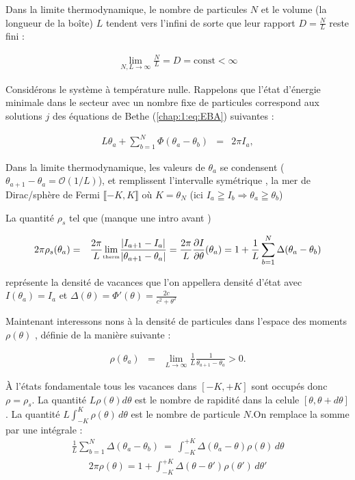 Dans la limite thermodynamique, le nombre de particules \( N \) et le volume 
(la longueur de la boîte) \( L \) tendent vers l'infini de sorte que leur rapport 
\( D = \frac{N}{L} \) reste fini :

\begin{eqnarray*}
	\lim_{N, L \to \infty} \frac{N}{L} = D = \mbox{const} < \infty	
\end{eqnarray*}

Considérons le système à température nulle. Rappelons que l'état 
d'énergie minimale dans le secteur avec un nombre fixe de particules 
correspond aux solutions \( j \) des équations de Bethe (\eqref{chap:1:eq:EBA}) suivantes :

\begin{eqnarray*}
	L \theta_a + \sum_{b = 1}^N \Phi ( \theta_a - \theta_b ) & = & 2\pi I_a ,	
\end{eqnarray*}

Dans la limite thermodynamique, les valeurs de \( \theta_a \) se condensent (\(\theta_{a+1} - \theta_a = \mathcal{O}(1/L)\)), et remplissent l'intervalle symétrique , la mer de Dirac/sphère de Fermi  \(\llbracket-K, K\rrbracket\) où $K = \theta_N$ (ici $I_a \geqq I_b \Rightarrow \theta_a \geqq \theta_b$)

La quantité $\rho_s$ tel que (manque une intro avant ) 

\begin{eqnarray*}
	2\pi \rho_s (\theta_a) & = & \frac{2\pi}{L}\underset{\tiny \mbox{therm}}{\lim} \frac{ \vert I_{a+1} - I_{a} \vert}{ \vert \theta_{a+1} - \theta_a \vert} = \frac{2\pi}{L} \frac{ \partial I}{\partial \theta } ( \theta_a ) = 1 	+ \frac{1}{L}\sum_{b = 1}^N \Delta (\theta_a - \theta_b)
\end{eqnarray*}

représente la densité de vacances que l'on appellera densité d'état avec $I(\theta_a) = I_a$ et  $\Delta(\theta) = \Phi'(\theta)  = \frac{2c}{c^2 + \theta^2}$

Maintenant interessons nons à la densité de particules dans l'espace des moments \( \rho(\theta) \) , définie de la manière suivante :

\begin{eqnarray*}
	\rho(\theta_a)  &=  &\lim_{L \to \infty} \frac{1}{L} \frac{1}{\theta_{a+1} - \theta_a} > 0.	
\end{eqnarray*}

À l'états fondamentale tous les vacances dans $[-K , +K ]$  sont occupés donc $\rho = \rho_s$. La quantité $L\rho(\theta)d\theta$ est le nombre de rapidité dans la celule $[ \theta , \theta + d \theta ] $. La quantité $L \int_{-K}^K \rho (\theta ) \, d\theta $ est le nombre de particule $N$.On remplace la somme par une intégrale :
\begin{eqnarray*}
	\frac{1}{L}\sum_{b = 1}^N \Delta (\theta_a - \theta_b) ~=~ \int_{-K}^{+K}\Delta (\theta_a - \theta)\rho(\theta)\,d \theta
\end{eqnarray*}
\begin{eqnarray*}
	2\pi \rho (\theta)  = 1 + \int_{-K}^{+K}\Delta (\theta - \theta')\rho(\theta')\,d \theta' 	
\end{eqnarray*}
